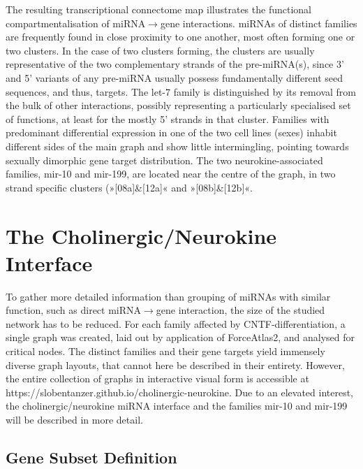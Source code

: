 The resulting transcriptional connectome map illustrates the functional compartmentalisation of miRNA$\to$gene interactions. miRNAs of distinct families are frequently found in close proximity to one another, most often forming one or two clusters. In the case of two clusters forming, the clusters are usually representative of the two complementary strands of the pre-miRNA(s), since 3' and 5' variants of any pre-miRNA usually possess fundamentally different seed sequences, and thus, targets. The let-7 family is distinguished by its removal from the bulk of other interactions, possibly representing a particularly specialised set of functions, at least for the mostly 5' strands in that cluster. Families with predominant differential expression in one of the two cell lines (sexes) inhabit different sides of the main graph and show little intermingling, pointing towards sexually dimorphic gene target distribution. The two neurokine-associated families, mir-10 and mir-199, are located near the centre of the graph, in two strand specific clusters (»[08a]\&[12a]« and »[08b]\&[12b]«.

\section{The Cholinergic/Neurokine Interface}
To gather more detailed information than grouping of miRNAs with similar function, such as direct miRNA$\to$gene interaction, the size of the studied network has to be reduced. For each family affected by CNTF-differentiation, a single graph was created, laid out by application of ForceAtlas2, and analysed for critical nodes. The distinct families and their gene targets yield immensely diverse graph layouts, that cannot here be described in their entirety. However, the entire collection of graphs in interactive visual form is accessible at https://slobentanzer.github.io/cholinergic-neurokine. Due to an elevated interest, the cholinergic/neurokine miRNA interface and the families mir-10 and mir-199 will be described in more detail.

\subsection{Gene Subset Definition}

